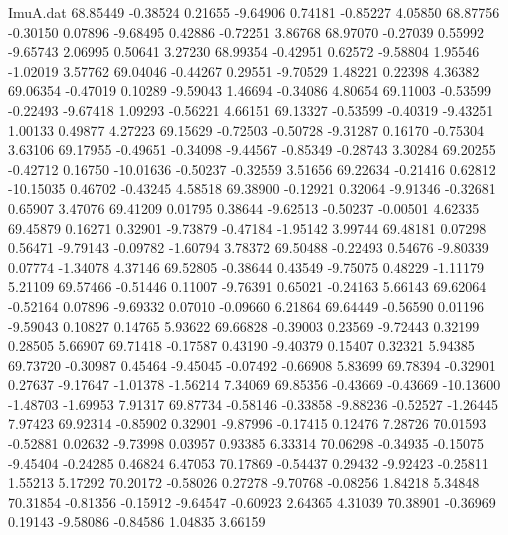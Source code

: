 \begin{filecontents}{ImuA.dat}
  68.85449   -0.38524    0.21655   -9.64906    0.74181   -0.85227    4.05850
  68.87756   -0.30150    0.07896   -9.68495    0.42886   -0.72251    3.86768
  68.97070   -0.27039    0.55992   -9.65743    2.06995    0.50641    3.27230
  68.99354   -0.42951    0.62572   -9.58804    1.95546   -1.02019    3.57762
  69.04046   -0.44267    0.29551   -9.70529    1.48221    0.22398    4.36382
  69.06354   -0.47019    0.10289   -9.59043    1.46694   -0.34086    4.80654
  69.11003   -0.53599   -0.22493   -9.67418    1.09293   -0.56221    4.66151
  69.13327   -0.53599   -0.40319   -9.43251    1.00133    0.49877    4.27223
  69.15629   -0.72503   -0.50728   -9.31287    0.16170   -0.75304    3.63106
  69.17955   -0.49651   -0.34098   -9.44567   -0.85349   -0.28743    3.30284
  69.20255   -0.42712    0.16750  -10.01636   -0.50237   -0.32559    3.51656
  69.22634   -0.21416    0.62812  -10.15035    0.46702   -0.43245    4.58518
  69.38900   -0.12921    0.32064   -9.91346   -0.32681    0.65907    3.47076
  69.41209    0.01795    0.38644   -9.62513   -0.50237   -0.00501    4.62335
  69.45879    0.16271    0.32901   -9.73879   -0.47184   -1.95142    3.99744
  69.48181    0.07298    0.56471   -9.79143   -0.09782   -1.60794    3.78372
  69.50488   -0.22493    0.54676   -9.80339    0.07774   -1.34078    4.37146
  69.52805   -0.38644    0.43549   -9.75075    0.48229   -1.11179    5.21109
  69.57466   -0.51446    0.11007   -9.76391    0.65021   -0.24163    5.66143
  69.62064   -0.52164    0.07896   -9.69332    0.07010   -0.09660    6.21864
  69.64449   -0.56590    0.01196   -9.59043    0.10827    0.14765    5.93622
  69.66828   -0.39003    0.23569   -9.72443    0.32199    0.28505    5.66907
  69.71418   -0.17587    0.43190   -9.40379    0.15407    0.32321    5.94385
  69.73720   -0.30987    0.45464   -9.45045   -0.07492   -0.66908    5.83699
  69.78394   -0.32901    0.27637   -9.17647   -1.01378   -1.56214    7.34069
  69.85356   -0.43669   -0.43669  -10.13600   -1.48703   -1.69953    7.91317
  69.87734   -0.58146   -0.33858   -9.88236   -0.52527   -1.26445    7.97423
  69.92314   -0.85902    0.32901   -9.87996   -0.17415    0.12476    7.28726
  70.01593   -0.52881    0.02632   -9.73998    0.03957    0.93385    6.33314
  70.06298   -0.34935   -0.15075   -9.45404   -0.24285    0.46824    6.47053
  70.17869   -0.54437    0.29432   -9.92423   -0.25811    1.55213    5.17292
  70.20172   -0.58026    0.27278   -9.70768   -0.08256    1.84218    5.34848
  70.31854   -0.81356   -0.15912   -9.64547   -0.60923    2.64365    4.31039
  70.38901   -0.36969    0.19143   -9.58086   -0.84586    1.04835    3.66159

\end{filecontents}
